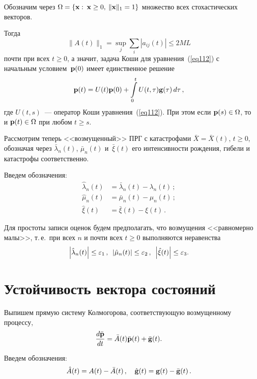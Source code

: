 \begin{multicols}{2}
Обозначим через $\Omega=\left\{{\bf x}: \: {\bf x}\geq 0,\: \|{\bf
x}\|_1=1\right\}$ множество всех стохастических векторов.


Тогда
\begin{equation*}
\|A(t)\|_1  = \sup_{j}\sum_i|a_{ij}(t)| \le 2M L  
\end{equation*}
почти при всех $t \ge 0$, а значит, задача Коши для
уравнения~(\ref{eq112}) с начальным условием~${\mathbf p}(0)$ имеет
единственное решение
\begin{equation*}
{\bf p}(t) =  U(t){\bf p}(0) + \int\limits_0^t U(t,\tau){\bf
g}(\tau)\, d\tau \,, 
\end{equation*}
где $U(t,s)$~--- оператор Коши уравнения~(\ref{eq112}). При
этом если ${\bf p}(s) \in \Omega$, то и ${\bf p}(t) \in \Omega$ при
любом  $t \ge s$.

Рассмотрим теперь <<возмущенный>> ПРГ с катастрофами  $\bar{X}=\bar{X}(t)$, $t\geq 0$, обозначая через  $\bar{\lambda}_n(t)$,
$\bar{\mu}_n(t)$ и~$\bar{\xi} (t)$ его  интенсивности рождения, гибели и катастрофы  соответственно.

Введем обозначения:
\begin{align*}
\hat{\lambda}_n(t)&=\bar{\lambda}_n(t)-\lambda_n(t)\,;\\
\hat{\mu}_n(t)&=\bar{\mu}_n(t)-\mu_n(t)\,;\\
\hat{\xi}(t)&=\bar{\xi}(t)-\xi(t)\,.
\end{align*}

Для простоты записи оценок будем предполагать, что возмущения <<равномерно малы>>, 
т.\,е.\ при всех $n$ и почти всех $t \ge 0$ выполняются неравенства
\begin{equation}
\left|\hat{\lambda}_n(t)\right| \le \varepsilon_1\,, \enskip
\left|\hat{\mu}_n(t)\right| \le \varepsilon_2\,, \enskip 
\left|\hat{\xi}(t)\right| \le \varepsilon_3.
\label{p1}
\end{equation}

\section{Устойчивость вектора состояний}

Выпишем прямую систему Колмогорова, соответствующую возмущенному процессу,
\begin{equation}
\frac{d\bar{\bf p}}{dt}=\bar{A}(t)\bar{\bf p}(t)+\bar{\bf g}(t).
\label{eq112p}
\end{equation}

Введем обозначения:
$$
\hat{A}(t)=A(t)-\bar{A}(t)\,,\quad \hat{\bf g}(t)={\bf g}(t)-\bar{\bf g}(t)\,.
$$


\end{multicols}

